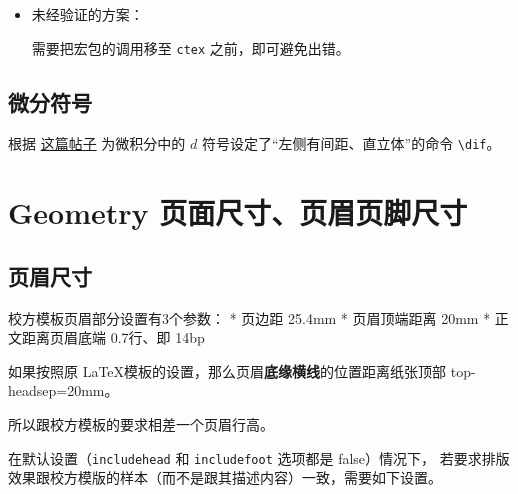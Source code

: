 \documentclass[../Main/thesis.tex]{subfiles}
\begin{document}
\begin{itemize}
\item
  未经验证的方案：

  需要把宏包的调用移至 \texttt{ctex} 之前，即可避免出错。
\end{itemize}

\subsection{微分符号}

根据
\href{https://liam.page/2017/05/01/the-correct-way-to-use-differential-operator/}{这篇帖子}
为微积分中的 \(d\) 符号设定了``左侧有间距、直立体''的命令
\texttt{\textbackslash{}dif}。

\section{Geometry
页面尺寸、页眉页脚尺寸}

\subsection{页眉尺寸}

校方模板页眉部分设置有3个参数： * 页边距 25.4mm * 页眉顶端距离 20mm *
正文距离页眉底端 0.7行、即 14bp

如果按照原 \LaTeX 模板的设置，那么页眉\textbf{底缘横线}的位置距离纸张顶部
top-headsep=20mm。

\begin{Shaded}
\begin{Highlighting}[]
\OtherTok{=}
\OtherTok{=}\StringTok{20mm,}
\OtherTok{=}
\end{Highlighting}
\end{Shaded}

所以跟校方模板的要求相差一个页眉行高。

在默认设置（\texttt{includehead} 和 \texttt{includefoot} 选项都是
false）情况下，
若要求排版效果跟校方模版的样本（而不是跟其描述内容）一致，需要如下设置。

\begin{Shaded}
\begin{Highlighting}[]
\OtherTok{=}
\OtherTok{=}
\OtherTok{=}
\end{Highlighting}
\end{Shaded}
\end{document}
